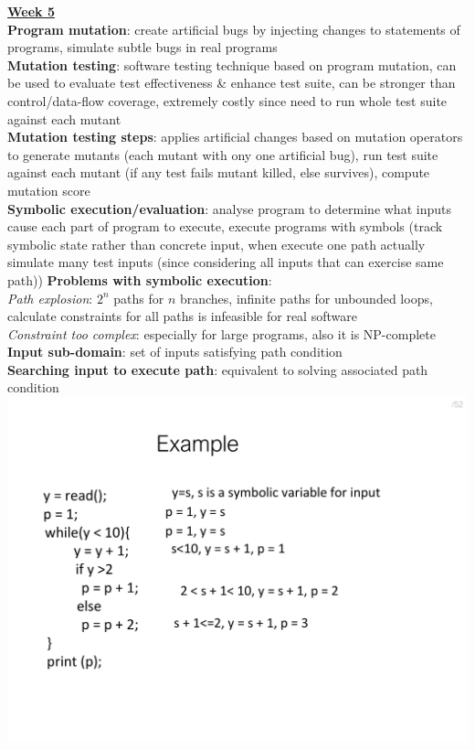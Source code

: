 \documentclass[a4paper]{article}
\begin{document}
\begin{multicols}{3}
        \underline{\textbf{Week 5}}\\
        \textbf{Program mutation}: create artificial bugs by injecting changes to statements of programs, simulate subtle bugs in real programs\\
        \textbf{Mutation testing}: software testing technique based on program mutation, can be used to evaluate test effectiveness \& enhance test suite, can be stronger than control/data-flow coverage, extremely costly since need to run whole test suite against each mutant\\
        \textbf{Mutation testing steps}: applies artificial changes based on mutation operators to generate mutants (each mutant with ony one artificial bug), run test suite against each mutant (if any test fails mutant killed, else survives), compute mutation score\\
        \textbf{Symbolic execution/evaluation}: analyse program to determine what inputs cause each part of program to execute, execute programs with symbols (track symbolic state rather than concrete input, when execute one path actually simulate many test inputs (since considering all inputs that can exercise same path))
        \textbf{Problems with symbolic execution}:\\
        \textit{Path explosion}: $2^n$ paths for $n$ branches, infinite paths for unbounded loops, calculate constraints for all paths is infeasible for real software\\
        \textit{Constraint too complex}: especially for large programs, also it is NP-complete\\
        \textbf{Input sub-domain}: set of inputs satisfying path condition\\
        \textbf{Searching input to execute path}: equivalent to solving associated path condition\\
        \includegraphics[width=\linewidth]{242.pdf}\\

\end{multicols}
\end{document}
